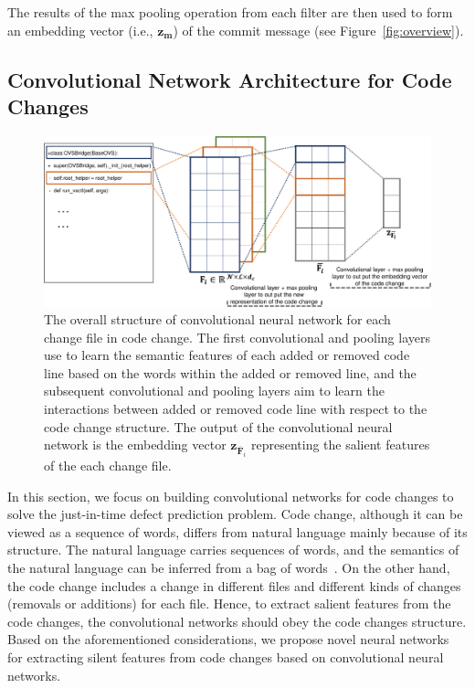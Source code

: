 The results of the max pooling operation from each filter are then used to form an embedding vector (i.e., $\textbf{z}_\textbf{m}$) of the commit message (see Figure~\ref{fig:overview}). 

\subsection{Convolutional Network Architecture for Code Changes}
\label{sec:cnn_code}

\begin{figure}
	\center
	\includegraphics[scale=0.25]{figs/code_framework.pdf}
	\caption{The overall structure of convolutional neural network for each change file in code change. The first convolutional and pooling layers use to learn the semantic features of each added or removed code line based on the words within the added or removed line, and the subsequent convolutional and pooling layers aim to learn the interactions between added or removed code line with respect to the code change structure. The output of the convolutional neural network is the embedding vector $\textbf{z}_{\overline{\textbf{F}}_{i}}$ representing the salient features of the each change file.}
	\label{fig:code}
\end{figure}

In this section, we focus on building convolutional networks for code changes to solve the just-in-time defect prediction problem. 
Code change, although it can be viewed as a sequence of words, differs from natural language mainly because of its structure. The natural language carries sequences of words, and the semantics of the natural language can be inferred from a bag of words~\cite{ng1997corpus}. On the other hand, the code change includes a change in different files and different kinds of changes (removals or additions) for each file. Hence, to extract salient features from the code changes, the convolutional networks should obey the code changes structure. 
Based on the aforementioned considerations, we propose novel neural networks for extracting silent features from code changes based on convolutional neural networks. 


